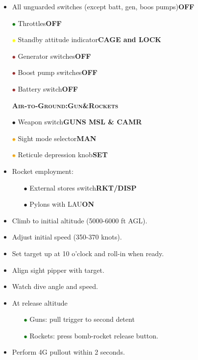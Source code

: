 \documentclass[a4paper,12pt,dvipsnames]{letter}
\newcommand{\button}[1]{\textbf{#1}}
\newcommand{\myHead}[1]{{\LARGE\textsc{\textbf{#1}}}}
\newcommand{\bi}{\textcolor{ProcessBlue}{$\bullet$\;}}
\newcommand{\gi}{\textcolor{Green}{$\bullet$\;}}
\newcommand{\yi}{\textcolor{Yellow}{$\bullet$\;}}
\newcommand{\oi}{\textcolor{Orange}{$\bullet$\;}}
\renewcommand{\ni}{\textcolor{Brown}{$\bullet$\;}}
\begin{document}
{\begin{itemize}
 \item All unguarded switches (except batt, gen, boos pumps)\dotfill\button{OFF}
 \item[\gi] Throttles\dotfill\button{OFF}
 \item[\yi] Standby attitude indicator\dotfill\button{CAGE and LOCK}
 \item[\ni] Generator switches\dotfill\button{OFF}
 \item[\ni] Boost pump switches\dotfill\button{OFF}
 \item[\ni] Battery switch\dotfill\button{OFF}
\end{itemize}
\newpage
\begin{itemize}
 \item[] \myHead{Air-to-Ground:\;Gun\;\&\;Rockets}
 \item[\bi] Weapon switch\dotfill\button{GUNS MSL \& CAMR}
 \item[\oi] Sight mode selector\dotfill\button{MAN}
 \item[\oi] Reticule depression knob\dotfill\button{SET}
 \item Rocket employment:
 \begin{itemize}
   \item[\bi] External stores switch\dotfill\button{RKT/DISP}
   \item[\bi] Pylons with LAU\dotfill\button{ON}
 \end{itemize}
 \item Climb to initial altitude (5000-6000 ft AGL).
 \item Adjust initial speed (350-370 knots).
 \item Set target up at 10 o'clock and roll-in when ready.
 \item Align sight pipper with target.
 \item Watch dive angle and speed.
 \item At release altitude
 \begin{itemize}
  \item[\gi] Guns: pull trigger to second detent
  \item[\gi] Rockets: press bomb-rocket release button.
 \end{itemize}
\item Perform 4G pullout within 2 seconds.
\end{itemize}
\vspace{1em}
\begin{itemize}

\end{itemize}}
\end{document}
